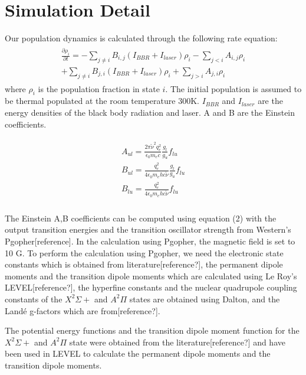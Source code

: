 \documentclass[aip,jcp,reprint]{revtex4-1}
\begin{document}
\section{Simulation Detail} 
Our population dynamics is calculated through the following rate equation:
\begin{align}
\begin{aligned}
\frac{\partial\rho_i}{\partial t}=-\sum_{j\neq i}B_{i,j}(I_{BBR}+I_{laser})\rho_i - \sum_{j<i}A_{i,j}\rho_i \\
+\sum_{j\neq i}B_{j,i}(I_{BBR}+I_{laser})\rho_i + \sum_{j>i}A_{j,i}\rho_i 
\end{aligned}
\end{align}
where $\rho_i$ is the population fraction in state $i$. The initial population is assumed to be thermal populated at the room temperature 300K. $I_{BBR}$ and $I_{laser}$ are the energy densities of the black body radiation and laser. A and B are the Einstein coefficients.

\begin{align}
\begin{aligned}
A_{ul} = \frac{2\pi \widetilde{\nu}^2 q_e^2}{\epsilon_0 m_e c} \frac{g_l}{g_u} f_{lu}\\
B_{ul} = \frac{q_e^2}{4 \epsilon_0 m_e h c \widetilde{\nu}} \frac{g_l}{g_u} f_{lu} \\
B_{lu} = \frac{q_e^2}{4 \epsilon_0 m_e h c \widetilde{\nu}} f_{lu}\\
\end{aligned}
\end{align}

The Einstein A,B coefficients can be computed using equation (2) with the output transition energies and the transition oscillator strength from Western's Pgopher[reference]. In the calculation using Pgopher, the magnetic field is set to 10 G. To perform the calculation using Pgopher, we need the electronic state constants which is obtained from literature[reference?], the permanent dipole moments and the transition dipole moments which are calculated using Le Roy's LEVEL[reference?], the hyperfine constants and the nuclear quadrupole coupling constants of the $X^2\Sigma+$ and $A^2\Pi$ states are obtained using Dalton, and the Landé g-factors which are from[reference?].

The potential energy functions and the transition dipole moment function for the $X^2 \Sigma+$ and $A^2\Pi$ state were obtained from the literature[reference?] and have been used in LEVEL to calculate the permanent dipole moments and the transition dipole moments.
\end{document}
